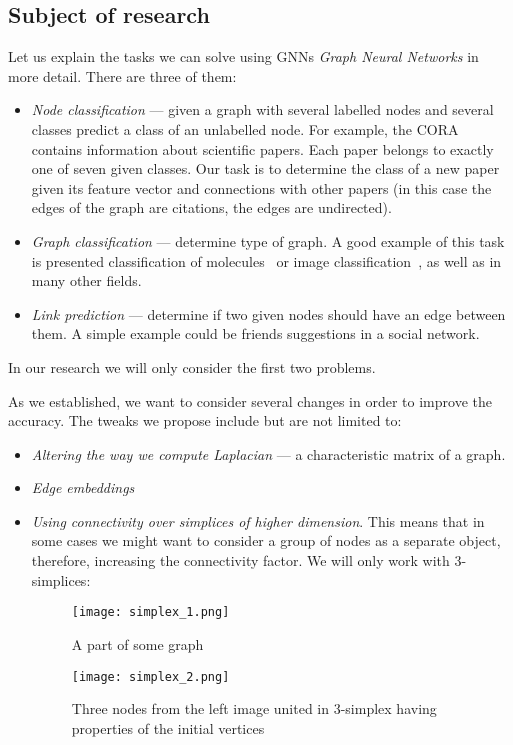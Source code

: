 \subsection{Subject of research}
Let us explain the tasks we can solve using GNNs \emph{Graph Neural Networks} in more detail.
There are three of them:
\begin{itemize}
	\item \textit{Node classification} --- given a graph with several labelled nodes and several classes predict a class of an unlabelled node.
	      For example, the CORA~\cite{cora_dataset} contains information about scientific papers.
	      Each paper belongs to exactly one of seven given classes.
	      Our task is to determine the class of a new paper given its feature vector and connections with other papers (in this case the edges of the graph are citations, the edges are undirected).
	\item \textit{Graph classification} --- determine type of graph.
	      A good example of this task is presented classification of molecules~\cite{how_powerful_are_gnns} or image classification~\cite{benchmarking_gnns}, as well as in many other fields.
	\item \textit{Link prediction} --- determine if two given nodes should have an edge between them.
	      A simple example could be friends suggestions in a social network.
\end{itemize}

In our research we will only consider the first two problems.

As we established, we want to consider several changes in order to improve the accuracy.
The tweaks we propose include but are not limited to:
\begin{itemize}
	\item \textit{Altering the way we compute Laplacian} --- a characteristic matrix of a graph.
	\item \textit{Edge embeddings}
	\item \textit{Using connectivity over simplices of higher dimension}. This means that in some cases we might want to consider a group of nodes as a separate object, therefore, increasing the connectivity factor. We will only work with 3-simplices:
	      \begin{figure}[h]
		      \begin{multicols}{2}
			      \centering
			      \texttt{[image: simplex\_1.png]}
			      \caption{A part of some graph}\label{fig:clique_merged}

			      \centering
			      \texttt{[image: simplex\_2.png]}
			      \caption{Three nodes from the left image united in 3-simplex having properties of the initial vertices}
		      \end{multicols}
	      \end{figure}
\end{itemize}

